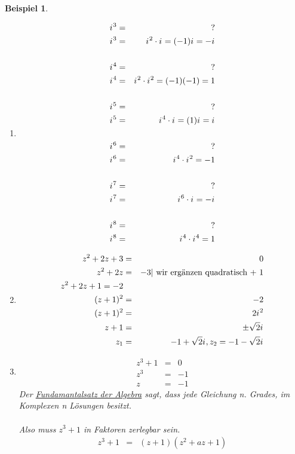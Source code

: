 \documentclass[a4paper,10pt]{report}
\newtheorem{myexample}{Beispiel}
\newcommand{\iu}{{i\mkern1mu}}
\begin{document}
\begin{myexample}
	\begin{enumerate}
		\item
		\begin{eqnarray*}
			\iu^3 &=& ?\\
			\iu^3 &=& \iu^2 \cdot \iu = (-1)\iu = -\iu\\
			\\
			\iu^4 &=& ?\\
			\iu^4 &=& \iu^2 \cdot \iu ^2 = (-1)(-1) = 1\\
			\\
			\iu^5 &=& ?\\
			\iu^5 &=& \iu^4 \cdot \iu = (1)\iu = \iu\\
			\\
			\iu^6 &=& ?\\
			\iu^6 &=& \iu^4 \cdot \iu^2 = -1\\
			\\
			\iu^7 &=& ?\\
			\iu^7 &=& \iu^6 \cdot \iu = -\iu\\
			\\
			\iu^8 &=& ?\\
			\iu^8 &=& \iu^4 \cdot \iu^4 = 1
		\end{eqnarray*}
		\item
		\begin{eqnarray*}
			z^2 + 2z + 3 &=& 0\\
			z^2 + 2z &=& -3 \text{| wir ergänzen quadratisch + 1}\\
			z^2 + 2z  + 1 = -2\\
			(z+1)^2 &=& -2\\
			(z+1)^2 &=& 2\iu^2\\
			z+1 &=& \pm \sqrt{2}\iu\\
			z_1 &=& -1 +\sqrt{2}\iu, z_2 = -1 -\sqrt{2}\iu
		\end{eqnarray*}
		\item
		\begin{eqnarray*}
			z^3 + 1 &=& 0\\
			z^3 &=& -1\\
			z &=& -1
		\end{eqnarray*}
		Der \underline{Fundamantalsatz der Algebra} sagt, dass jede Gleichung n. Grades, im Komplexen n Lösungen besitzt.\\
		\\
		Also muss $z^3+1$ in Faktoren zerlegbar sein.
		\begin{eqnarray*}
			z^3 + 1 &=& (z+1)(z^2+az+1)\\

\end{eqnarray*}
\end{enumerate}
\end{myexample}
\end{document}

